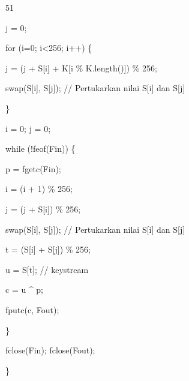 \documentclass{article}
\begin{document}

51

j = 0;

 for (i=0; i<256; i++) \{

    j = (j + S[i] + K[i \% K.length()]) \% 256;

    swap(S[i], S[j]); // Pertukarkan nilai S[i] dan S[j] 

 \}


 i = 0;   j = 0;

while (!feof(Fin)) \{

    p = fgetc(Fin);

    i = (i + 1) \% 256;

    j = (j + S[i]) \% 256;

    swap(S[i], S[j]);    // Pertukarkan nilai S[i] dan S[j] 

    t = (S[i] + S[j]) \% 256;

    u = S[t];   // keystream 

    c = u \textasciicircum{} p;           

    fputc(c, Fout);     

 \}   

 fclose(Fin);  fclose(Fout);

\}
\end{document}
